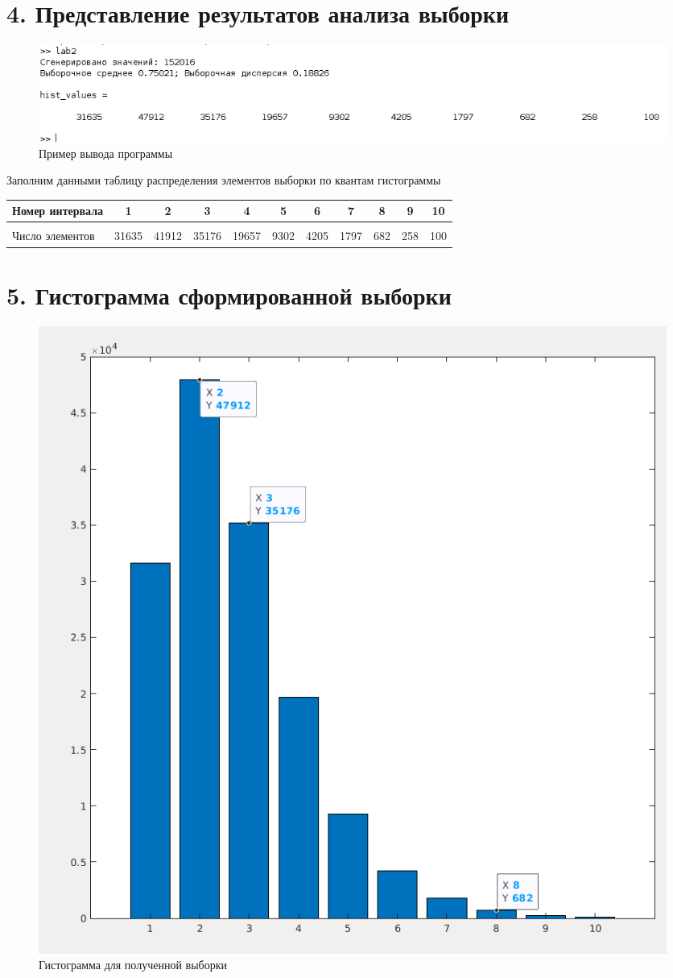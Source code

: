 \documentclass[12pt]{article}
\begin{document}
\newpage
 \section*{4. Представление результатов анализа выборки}
 
 \begin{figure}[!h]
	\centering
	\includegraphics[width=\linewidth]{hist_values_example.png}
	\caption{Пример вывода программы}
\end{figure}

Заполним данными таблицу распределения элементов выборки по квантам гистограммы

\begin{center}
	\begin{tabular}[c]{l|cccccccccc}
  		Номер интервала & 1 & 2 & 3 & 4 & 5 & 6 & 7 & 8 & 9 & 10 \\\hline
  		&&&\\
		Число элементов & 31635 & 41912 & 35176 & 19657 & 9302 & 4205 & 1797 & 682 & 258 & 100\\
	\end{tabular}
\end{center}
 
 \section*{5. Гистограмма сформированной выборки}
 
\begin{figure}[!h]
	\centering
	\includegraphics[width=0.5\linewidth]{hist_example.png}
	\caption{Гистограмма для полученной выборки}
\end{figure}
\end{document}
